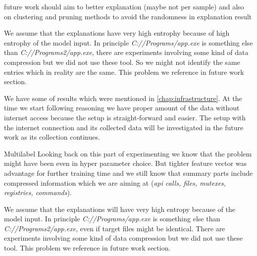 future work should aim to better explanation (maybe not per sample) and also on clustering and pruning methods to avoid the randomness in explanation result


We assume that the explanations have very high entrophy because of high entrophy of the model input. In principle \emph{C://Programs/app.exe} is something else than \emph{C://Programs2/app.exe}, there are experiments involving some kind of data compression but we did not use these tool. So we might not identify the same entries which in reality are the same. This problem we reference in future work section.

We have some of results which were mentioned in \ref{chap:infrastructure}. At the time we start following reasoning we have proper amount of the data without internet access because the setup is straight-forward and easier. The setup with the internet connection and its collected data will be investigated in the future work as its collection continues. 


Multilabel
Looking back on this part of experimenting we know that the problem might have been even in hyper parameter choice. But tighter feature vector was advantage for further training time and we still know that summary parts include compressed information which we are aiming at (\emph{api calls, files, mutexes, registries, commands}).

We assume that the explanations will have very high entropy because of the model input. In principle \emph{C://Programs/app.exe} is something else than \emph{C://Programs2/app.exe}, even if target files might be identical. There are experiments involving some kind of data compression but we did not use these tool. This problem we reference in future work section.






